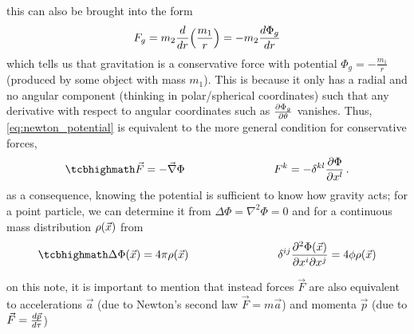 this can also be brought into the form
\begin{equation}\label{eq:newton_potential}
F_g = m_2 \dv{r}\qty(\frac{m_1}{r}) = - m_2 \dv{\Phi_g}{r}
\end{equation}
which tells us that gravitation is a conservative force with potential $\Phi_g = - \frac{m_1}{r}$ (produced by some object with mass $m_1$). This is because it only has a radial and no angular component (thinking in polar/spherical coordinates) such that any derivative with respect to angular coordinates such as $\pdv{\Phi_g}{\theta}$ vanishes. Thus, \eqref{eq:newton_potential} is equivalent to the more general condition for conservative forces,
\begin{equation}\label{eq:cons_force}
\eqbox{
\vec{F} = - \vec{\nabla} \Phi
}
\manyqquad
F^k = - \delta^{k l} \pdv{\Phi}{x^l} \, .
\end{equation}
as a consequence, knowing the potential is sufficient to know how gravity acts; for a point particle, we can determine it from $\Delta \Phi = \nabla^2 \Phi = 0$ and for a continuous mass distribution $\rho\qty(\vec{x})$ from
\begin{equation}\label{eq:field_eq_newton}
\eqbox{
\Delta \Phi\qty(\vec{x}) = 4 \pi \rho\qty(\vec{x})
}
\manyqquad
\delta^{ij} \pdv[2]{\Phi(\vec{x})}{x^i}{x^j} = 4 \phi \rho\qty(\vec{x})
\end{equation}

on this note, it is important to mention that instead forces $\vec{F}$ are also equivalent to accelerations $\vec{a}$ (due to Newton's second law $\vec{F} = m \vec{a}$) and momenta $\vec{p}$ (due to $\vec{F} = \dv{\vec{p}}{\tau}$)


